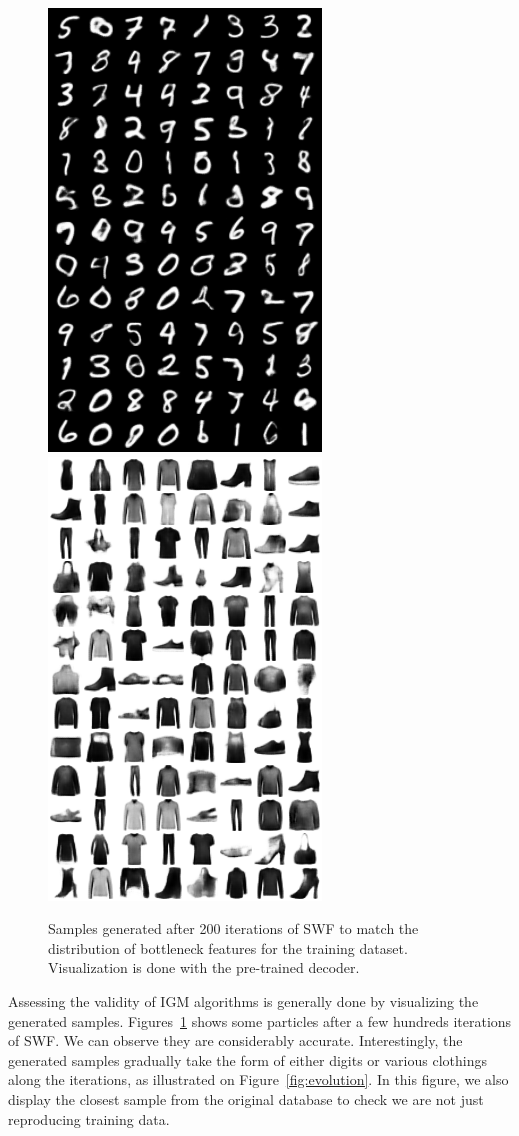 \begin{figure}
\centering
\includegraphics[width=0.45\columnwidth]{figures/MNIST_train_image_1000.png}
\includegraphics[width=0.45\columnwidth]{figures/FashionMNIST_train_image_1000.png}
\label{fig:samples}
\caption{Samples generated after 200 iterations of SWF to match the distribution of bottleneck features for the training dataset. Visualization is done with the pre-trained decoder.}
\end{figure}


Assessing the validity of IGM algorithms is generally done by visualizing the generated samples. Figures~\ref{fig:samples} shows some particles after a few hundreds iterations of SWF. We can observe they are considerably accurate. Interestingly, the generated samples gradually take the form of either digits or various clothings along the iterations, as illustrated on Figure~\ref{fig:evolution}. In this figure, we also display the closest sample from the original database to check we are not just reproducing training data.

